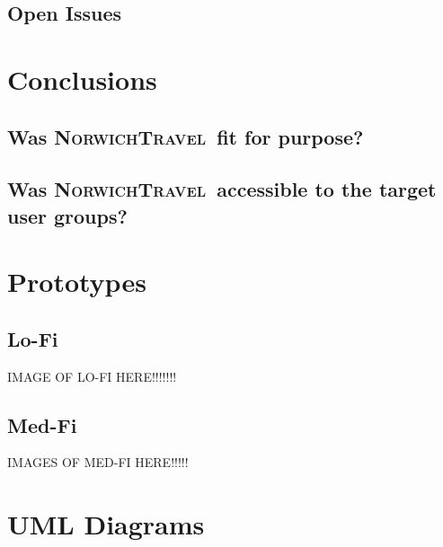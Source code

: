 \documentclass[cmpstyle]{ueacmpstyle}
\newcommand{\nt}{\textsc{NorwichTravel}}
\begin{document}
		\subsection{Open Issues} \label{sec:open}
	\section{Conclusions} \label{sec:conc}
	
		\subsection{Was \nt \ fit for purpose?} \label{sec:fit}
		
		\subsection{Was \nt \ accessible to the target user groups?} \label{sec:accessibletotarget}
	
	
	
	
	\appendix
	\section{Prototypes} \label{app:proto}
	
		\subsection{Lo-Fi} \label{app:lo-fi}
		
		IMAGE OF LO-FI HERE!!!!!!!
		
		\subsection{Med-Fi} \label{app:med-fi}
		
		IMAGES OF MED-FI HERE!!!!!
	
	\section{UML Diagrams}
\end{document}
